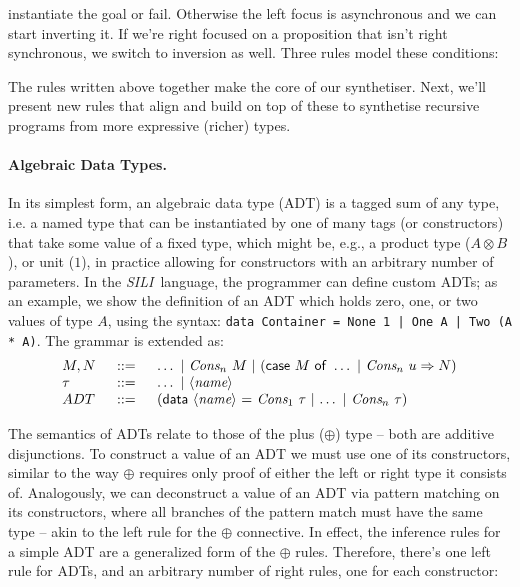 \documentclass{llncs}
\newcommand{\tensor}{\otimes}
\newcommand{\mypara}[1]{\paragraph{\textbf{#1}.}}
\newcommand{\synname}{\emph{SILI}}
\begin{document}
instantiate the goal or fail. Otherwise the left focus is asynchronous and we
can start inverting it. If we're right focused on a proposition that isn't right
synchronous, we switch to inversion as well. Three rules model these conditions:
%
The rules written above together make the core of our synthetiser. Next, we'll
present new rules that align and build on top of these to synthetise recursive
programs from more expressive (richer) types.

\mypara{Algebraic Data Types} In its simplest form, an algebraic data type (ADT)
is a tagged sum of any type, i.e. a named type that can be instantiated by one of many
tags (or constructors) that take some value of  a fixed type, which might
be, e.g., a product type ($A \tensor B$), or unit ($1$), in practice allowing
for constructors with an arbitrary number of parameters. In the \synname\
language, the programmer can define custom ADTs; as an example, we show the
definition of an ADT which holds zero, one, or two
values of type $A$, using the syntax: \texttt{data Container
= None 1 | One A | Two (A * A)}. The grammar is extended as:
\[
\begin{tabular}{lclc}
    $M,N$ & $\ ::=\ $ & $\dots\ \vert\ \emph{Cons}_n\ M\ \vert\ (\mathsf{case}\
    M\ \mathsf{of}\ \dots\ \vert\ \emph{Cons}_n\ u \Rightarrow N)$ \\
    $\tau$ & $\ ::=\ $ & $\dots\ \vert\ \langle\emph{name}\rangle$ \\
    $ADT$ & $\ ::=\ $ & (\textsf{data} $\langle\emph{name}\rangle$\ $=$\ $\emph{Cons}_1\ \tau$\
$\vert$\ $\dots$\ $\vert$\ $\emph{Cons}_n\ \tau$) \\ \end{tabular}
\]

The semantics of ADTs relate to those of the plus ($\oplus$) type
-- both are additive disjunctions.  To construct a value of an ADT we
must use one of its constructors, similar to the way $\oplus$ requires
only proof of either the left or right type it consists
of. Analogously, we can deconstruct a value of an ADT via pattern
matching on its constructors, where all branches of the pattern match
must have the same type -- akin to the left rule for the $\oplus$
connective. In effect, the inference rules for a simple ADT are a
generalized form of the $\oplus$ rules.  Therefore, there's one left
rule for ADTs, and an arbitrary number of right rules, one for each
constructor:
\end{document}
